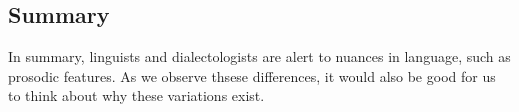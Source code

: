 \documentclass[../main.tex]{subfiles}
\begin{document}

        \subsection{Summary}
        In summary, linguists and dialectologists are alert to nuances in language, such as prosodic features. As we observe thsese differences, it would also be good for us to think about why these variations exist.
\end{document}
